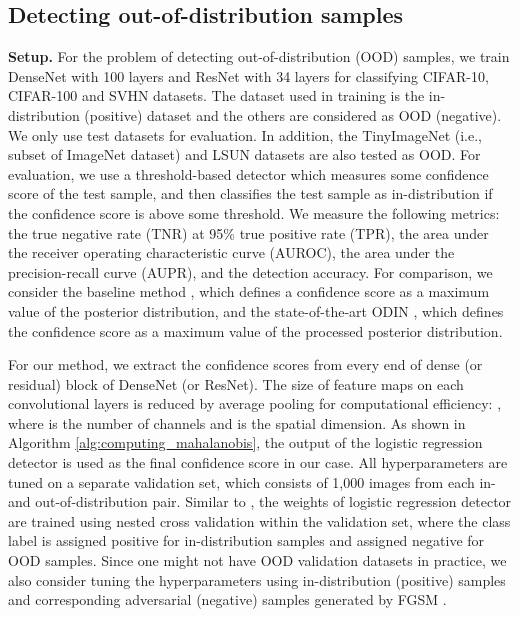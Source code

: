 \documentclass{article}
\begin{document}
\subsection{Detecting out-of-distribution samples}

{\bf Setup.} For the problem of detecting out-of-distribution (OOD) samples,
we train DenseNet with 100 layers and ResNet with 34 layers for classifying CIFAR-10, CIFAR-100 and SVHN datasets.
The dataset used in training is the in-distribution (positive) dataset and the others are considered as OOD (negative).
We only use test datasets for evaluation.
In addition, 
the TinyImageNet (i.e., subset of ImageNet dataset) and LSUN datasets are also tested as OOD.
For evaluation, 
we use a threshold-based detector which measures some confidence score of the test sample, and then classifies the test sample as in-distribution if the confidence score is above some threshold.
We measure the following metrics:
the true negative rate (TNR) at 95\% true positive rate (TPR),
the area under the receiver operating characteristic curve (AUROC),
the area under the precision-recall curve (AUPR), and
the detection accuracy.
For comparison, we consider the baseline method \citep{hendrycks2016baseline}, 
which defines a confidence score as a maximum value of the posterior distribution, and the state-of-the-art ODIN \citep{liang2017principled}, which defines the confidence score as a maximum value of the processed posterior distribution.



For our method, we extract the confidence scores from every end of dense (or residual) block of DenseNet (or ResNet).
The size of feature maps on each convolutional layers is reduced by average pooling for computational efficiency: , where  is the number of channels and  is the spatial dimension.
As shown in Algorithm \ref{alg:computing_mahalanobis}, 
the output of the logistic regression detector is used as the final confidence score in our case.
All hyperparameters are tuned on a separate validation set, which consists of 1,000 images from each in- and out-of-distribution pair.
Similar to \citet{ma2018characterizing}, the weights of logistic regression detector are trained using nested cross validation within the validation set, where the class label is assigned positive for in-distribution samples and assigned negative for OOD samples.
Since one might not have OOD validation datasets in practice,
we also consider tuning the hyperparameters using in-distribution (positive) samples and corresponding adversarial (negative) samples generated by FGSM \citep{goodfellow2014explaining}.
\end{document}
